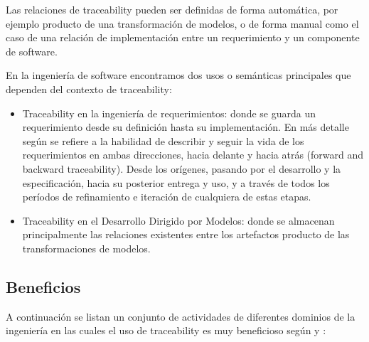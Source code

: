 \documentclass[a4paper,12pt,oneside,spanish]{book}
\begin{document}
Las relaciones de traceability pueden ser definidas de forma automática, por ejemplo producto de una transformación de modelos, o de forma manual como el caso de una relación de implementación entre un requerimiento y un componente de software.

En la ingeniería de software encontramos dos usos o semánticas principales que dependen del contexto de traceability:

\begin{itemize}

\item Traceability en la ingeniería de requerimientos: donde se guarda un requerimiento desde su definición hasta su implementación. En más detalle según \cite{GotelFinkelstein} se refiere a la habilidad de describir y seguir la vida de los requerimientos en ambas direcciones, hacia delante y hacia atrás (forward and backward traceability). Desde los orígenes, pasando por el desarrollo y la especificación, hacia su posterior entrega y uso, y a través de todos los períodos de refinamiento e iteración de cualquiera de estas etapas.

\item Traceability en el Desarrollo Dirigido por Modelos: donde se almacenan principalmente las relaciones existentes entre los artefactos producto de las transformaciones de modelos.

\end{itemize}

\subsection{Beneficios}

A continuación se listan un conjunto de actividades de diferentes dominios de la ingeniería en las cuales el uso de traceability es muy beneficioso según \cite{BrcinaRiebisch} y \cite{GrammelVoigt}:
\end{document}
